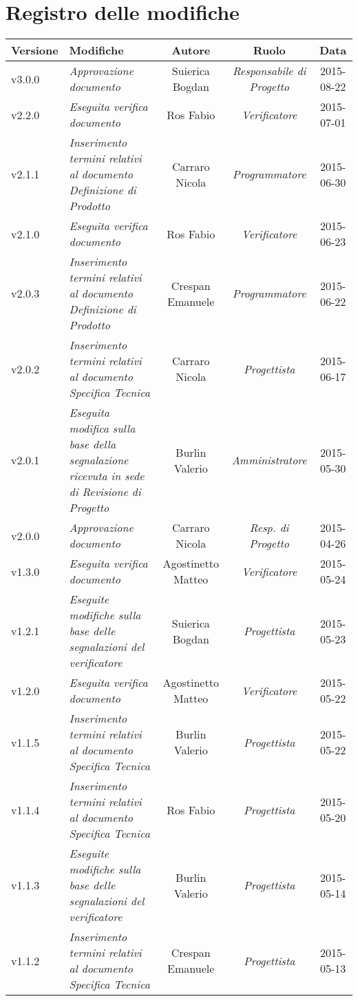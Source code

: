 \newpage
\section*{Registro delle modifiche}

\begin{table}[h]
\centering
\begin{tabular}{|p{}|p{}|c|c|c|}
	\toprule
		\textbf{Versione} & \textbf{Modifiche} & \textbf{Autore} & \textbf{Ruolo} & \textbf{Data} \\
	\midrule
	\midrule
		v3.0.0 & \textit{Approvazione documento} & Suierica Bogdan & \textit{Responsabile di Progetto} & 2015-08-22\\
	\midrule
		v2.2.0 & \textit{Eseguita verifica documento} & Ros Fabio & \textit{Verificatore} & 2015-07-01\\
	\midrule
		v2.1.1 & \textit{Inserimento termini relativi al documento Definizione di Prodotto} & Carraro Nicola & \textit{Programmatore} & 2015-06-30\\
	\midrule
		v2.1.0 & \textit{Eseguita verifica documento} & Ros Fabio & \textit{Verificatore} & 2015-06-23\\
	\midrule
		v2.0.3 & \textit{Inserimento termini relativi al documento Definizione di Prodotto} & Crespan Emanuele & \textit{Programmatore} & 2015-06-22\\
	\midrule
		v2.0.2 & \textit{Inserimento termini relativi al documento Specifica Tecnica} & Carraro Nicola & \textit{Progettista} & 2015-06-17\\
	\midrule
		v2.0.1 & \textit{Eseguita modifica sulla base della segnalazione ricevuta in sede di Revisione di Progetto} & Burlin Valerio & \textit{Amministratore} & 2015-05-30\\
	\midrule
		v2.0.0 & \textit{Approvazione documento} & Carraro Nicola & \textit{Resp. di Progetto} & 2015-04-26\\
	\midrule
		v1.3.0 & \textit{Eseguita verifica documento} & Agostinetto Matteo & \textit{Verificatore} & 2015-05-24\\
	\midrule
		v1.2.1 & \textit{Eseguite modifiche sulla base delle segnalazioni del verificatore} & Suierica Bogdan & \textit{Progettista} & 2015-05-23\\
	\midrule
		v1.2.0 & \textit{Eseguita verifica documento} & Agostinetto Matteo & \textit{Verificatore} & 2015-05-22\\
	\midrule
		v1.1.5 & \textit{Inserimento termini relativi al documento Specifica Tecnica} & Burlin Valerio & \textit{Progettista} & 2015-05-22\\
	\midrule
		v1.1.4 & \textit{Inserimento termini relativi al documento Specifica Tecnica} & Ros Fabio & \textit{Progettista} & 2015-05-20\\
	\midrule
		v1.1.3 & \textit{Eseguite modifiche sulla base delle segnalazioni del verificatore} & Burlin Valerio & \textit{Progettista} & 2015-05-14\\
	\midrule
		v1.1.2 & \textit{Inserimento termini relativi al documento Specifica Tecnica} & Crespan Emanuele & \textit{Progettista} & 2015-05-13\\
	\bottomrule
\end{tabular}	
\end{table}

